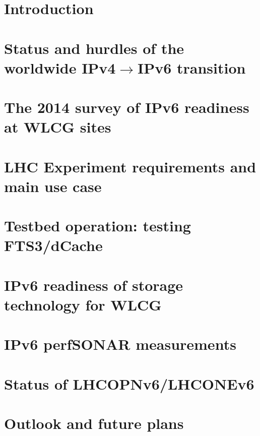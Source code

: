\documentclass[a4paper]{jpconf}
\begin{document}
\section{Introduction}


\section{Status and hurdles of the worldwide IPv4$\rightarrow$IPv6 transition}


\section{The 2014 survey of IPv6 readiness at WLCG sites}


\section{LHC Experiment requirements and main use case}


\section{Testbed operation: testing FTS3/dCache}


\section{IPv6 readiness of storage technology for WLCG}


\section{IPv6 perfSONAR measurements}


\section{Status of LHCOPNv6/LHCONEv6}


\section{Outlook and future plans}



\par

\end{document}
